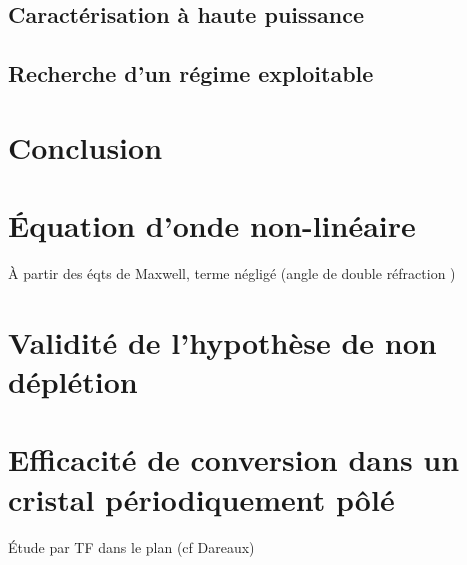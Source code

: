 \documentclass[11pt,a4paper] { article}
\begin{document}
\subsection{Caractérisation à haute puissance}
\subsection{Recherche d'un régime exploitable}
\section{Conclusion}

\appendix
\section{\'Equation d'onde non-linéaire}
\label{NL}
À partir des éqts de Maxwell, terme négligé (angle de double réfraction \cite{joffre}) \cite{boyd}

\section{Validité de l'hypothèse de non déplétion}
\label{ndepl}

\section{Efficacité de conversion dans un cristal périodiquement pôlé}
Étude par TF dans le plan (cf Dareaux)
\label{BK}




\end{document}
